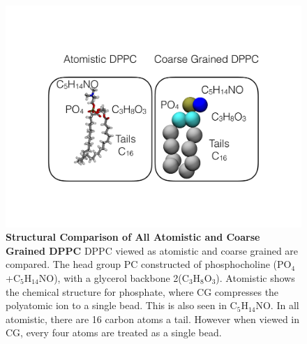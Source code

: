 \documentclass[10pt, letterpaper]{article}
\begin{document}
\begin{figure}[H]
   \centerline{\includegraphics[width=\textwidth,scale=0.5]{CGvAALipids.pdf}}
   \caption[Structural Comparison of All Atomistic and Coarse Grained DPPC]{ \textbf{Structural Comparison of All Atomistic and Coarse Grained DPPC} DPPC viewed as atomistic and coarse grained are compared. The head group PC constructed of phosphocholine (PO$_4$+C$_5$H$_{14}$NO), with a glycerol backbone 2(C$_3$H$_8$O$_3$). Atomistic shows the chemical structure for phosphate, where CG compresses the polyatomic ion to a single bead. This is also seen in C$_5$H$_{14}$NO. In all atomistic, there are 16 carbon atoms a tail. However when viewed in CG, every four atoms are treated as a single bead. 
}\label{fig:AACG}
\end{figure}
   \newpage
\end{document}
